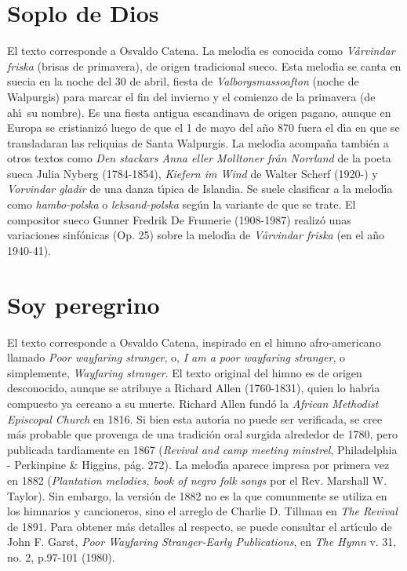 \documentclass[landscape,12pt]{report}
\begin{document}
\section*{\small Soplo de Dios} \noindent\footnotesize El texto corresponde a Osvaldo Catena. La melod\'\i a es conocida como \emph{V\aa rvindar friska} (brisas de primavera), de origen tradicional sueco. Esta melod\'\i a se canta en suecia en la noche del 30 de abril, fiesta de \emph{Valborgsmassoafton} (noche de Walpurgis) para marcar el fin del invierno y el comienzo de la primavera (de ah\'\i\ su nombre). Es una fiesta antigua escandinava de origen pagano, aunque en Europa se cristianiz\'o luego de que el 1 de mayo del a\~no 870 fuera el d\'\i a en que se transladaran las reliquias de Santa Walpurgis. La melod\'\i a acompa\~na tambi\'en a otros textos como \emph{Den stackars Anna eller Molltoner fr\aa n Norrland} de la poeta sueca Julia Nyberg (1784-1854), \emph{Kiefern im Wind} de Walter Scherf (1920-) y \emph{Vorvindar gladir} de una danza t\'\i pica de Islandia. Se suele clasificar a la melod\'\i a como \emph{hambo-polska} o \emph{leksand-polska} seg\'un la variante de que se trate. El compositor 
sueco Gunner Fredrik De Frumerie (1908-1987) realiz\'o unas variaciones sinf\'onicas (Op. 25) sobre la melod\'\i a de \emph{V\aa rvindar friska} (en el a\~no 1940-41). 
\section*{\small Soy peregrino} \noindent\footnotesize El texto corresponde a Osvaldo Catena, inspirado en el himno afro-americano llamado \emph{Poor wayfaring stranger}, o, \emph{I am a poor wayfaring stranger}, o simplemente, \emph{Wayfaring stranger}. El texto original del himno es de origen desconocido, aunque se atribuye a Richard Allen (1760-1831), quien lo habr\'\i a compuesto ya cercano a su muerte. Richard Allen fund\'o la \emph{African Methodist Episcopal Church} en 1816. Si bien esta autor\'\i a no puede ser verificada, se cree m\'as probable que provenga de una tradici\'on oral surgida alrededor de 1780, pero publicada tard\'\i amente en 1867 (\emph{Revival and camp meeting minstrel}, Philadelphia - Perkinpine \& Higgins, p\'ag. 272). La melod\'\i a aparece impresa por primera vez en 1882 (\emph{Plantation melodies, book of negro folk songs} por el Rev. Marshall W. Taylor). Sin embargo, la versi\'on de 1882 no es la que comunmente se utiliza en los himnarios y cancioneros, sino el arreglo de 
Charlie D. Tillman en \emph{The Revival} de 1891. Para obtener m\'as detalles al respecto, se puede consultar el art\'\i culo de John F. Garst, \emph{Poor Wayfaring Stranger-Early Publications}, en \emph{ The Hymn} v. 31, no. 2, p.97-101 (1980).
\end{document}
